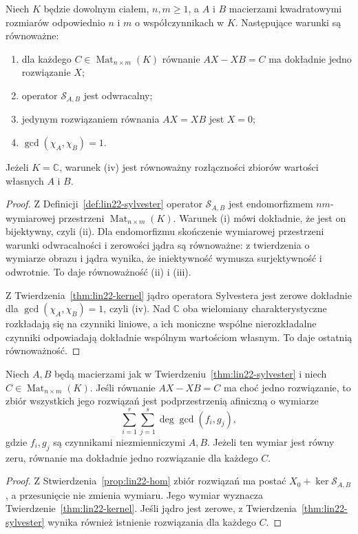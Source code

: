 \begin{twierdzenie}
\label{thm:lin22-sylvester}
Niech \(K\) będzie dowolnym ciałem,
\(n,m\ge1\), a \(A\) i \(B\)
macierzami kwadratowymi rozmiarów
odpowiednio \(n\) i \(m\)
o współczynnikach w \(K\).
Następujące warunki są równoważne:
\begin{enumerate}[label=\textup{(\roman*)}]
 \item dla każdego
 \(C\in\operatorname{Mat}_{n\times m}(K)\)
 równanie \(AX-XB=C\)
 ma dokładnie jedno rozwiązanie \(X\);
 \item operator \(\mathcal S_{A,B}\)
 jest odwracalny;
 \item jedynym rozwiązaniem
 równania \(AX=XB\) jest \(X=0\);
 \item \(\gcd(\chi_A,\chi_B)=1\).
\end{enumerate}
Jeżeli \(K=\mathbb C\), warunek
\textup{(iv)} jest równoważny
rozłączności zbiorów wartości
własnych \(A\) i \(B\).
\end{twierdzenie}
\begin{proof}
Z Definicji~\ref{def:lin22-sylvester}
operator \(\mathcal S_{A,B}\)
jest endomorfizmem
\(nm\)-wymiarowej przestrzeni
\(\operatorname{Mat}_{n\times m}(K)\).
Warunek (i) mówi dokładnie,
że jest on bijektywny, czyli (ii).
Dla endomorfizmu skończenie wymiarowej
przestrzeni warunki odwracalności
i zerowości jądra są równoważne:
z twierdzenia o wymiarze
obrazu i jądra wynika,
że iniektywność wymusza
surjektywność i odwrotnie.
To daje równoważność (ii) i (iii).

Z Twierdzenia~\ref{thm:lin22-kernel}
jądro operatora Sylvestera
jest zerowe dokładnie dla
\(\gcd(\chi_A,\chi_B)=1\),
czyli (iv).
Nad \(\mathbb C\) oba wielomiany
charakterystyczne rozkładają się
na czynniki liniowe, a ich
moniczne wspólne nierozkładalne
czynniki odpowiadają dokładnie
wspólnym wartościom własnym.
To daje ostatnią równoważność.
\end{proof}

\begin{wniosek}
\label{cor:lin22-affine}
Niech \(A,B\) będą macierzami
jak w Twierdzeniu~\ref{thm:lin22-sylvester}
i niech
\(C\in\operatorname{Mat}_{n\times m}(K)\).
Jeśli równanie \(AX-XB=C\)
ma choć jedno rozwiązanie,
to zbiór wszystkich jego rozwiązań
jest podprzestrzenią afiniczną
o wymiarze
\[
 \sum_{i=1}^r\sum_{j=1}^s
       \deg\gcd(f_i,g_j),
\]
gdzie \(f_i,g_j\) są czynnikami
niezmienniczymi \(A,B\).
Jeżeli ten wymiar jest równy zeru,
równanie ma dokładnie jedno rozwiązanie
dla każdego \(C\).
\end{wniosek}
\begin{proof}
Z
Stwierdzenia~\ref{prop:lin22-hom}
zbiór rozwiązań ma postać
\(X_0+\ker\mathcal S_{A,B}\),
a przesunięcie nie zmienia wymiaru.
Jego wymiar wyznacza
Twierdzenie~\ref{thm:lin22-kernel}.
Jeśli jądro jest zerowe,
z Twierdzenia~\ref{thm:lin22-sylvester}
wynika również istnienie
rozwiązania dla każdego \(C\).
\end{proof}

